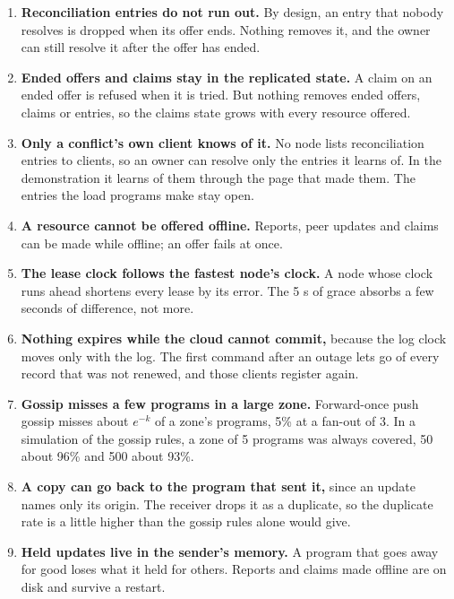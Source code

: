 \begin{enumerate}
  \item \textbf{Reconciliation entries do not run out.} By design, an entry that nobody resolves is dropped when its offer ends. Nothing removes it, and the owner can still resolve it after the offer has ended. %
  \item \textbf{Ended offers and claims stay in the replicated state.} A claim on an ended offer is refused when it is tried. But nothing removes ended offers, claims or entries, so the claims state grows with every resource offered. %
  \item \textbf{Only a conflict's own client knows of it.} No node lists reconciliation entries to clients, so an owner can resolve only the entries it learns of. In the demonstration it learns of them through the page that made them. The entries the load programs make stay open. %
  \item \textbf{A resource cannot be offered offline.} Reports, peer updates and claims can be made while offline; an offer fails at once. %
  \item \textbf{The lease clock follows the fastest node's clock.} A node whose clock runs ahead shortens every lease by its error. The 5 s of grace absorbs a few seconds of difference, not more. %
  \item \textbf{Nothing expires while the cloud cannot commit,} because the log clock moves only with the log. The first command after an outage lets go of every record that was not renewed, and those clients register again. %
  \item \textbf{Gossip misses a few programs in a large zone.} Forward-once push gossip misses about $e^{-k}$ of a zone's programs, 5\% at a fan-out of 3. In a simulation of the gossip rules, a zone of 5 programs was always covered, 50 about 96\% and 500 about 93\%. %
  \item \textbf{A copy can go back to the program that sent it,} since an update names only its origin. The receiver drops it as a duplicate, so the duplicate rate is a little higher than the gossip rules alone would give. %
  \item \textbf{Held updates live in the sender's memory.} A program that goes away for good loses what it held for others. Reports and claims made offline are on disk and survive a restart. %

\end{enumerate}

